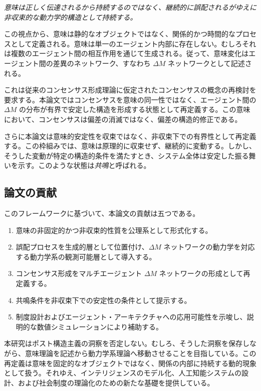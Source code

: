 \documentclass[11pt,a4paper]{article}
\theoremstyle{definition}
\begin{document}
\textit{意味は正しく伝達されるから持続するのではなく、継続的に誤配されるがゆえに非収束的な動力学的構造として持続する。}

この視点から、意味は静的なオブジェクトではなく、関係的かつ時間的なプロセスとして定義される。意味は単一のエージェント内部に存在しない。むしろそれは複数のエージェント間の相互作用を通じて生成される。従って、意味変化はエージェント間の差異のネットワーク、すなわち $\Delta M$ ネットワークとして記述される。

これは従来のコンセンサス形成理論に仮定されたコンセンサスの概念の再検討を要求する。本論文ではコンセンサスを意味の同一性ではなく、エージェント間の $\Delta M$ の分布が有界で安定した構造を形成する状態として再定義する。この意味において、コンセンサスは偏差の消滅ではなく、偏差の構造的修正である。

さらに本論文は意味的安定性を収束ではなく、非収束下での有界性として再定義する。この枠組みでは、意味は原理的に収束せず、継続的に変動する。しかし、そうした変動が特定の構造的条件を満たすとき、システム全体は安定した振る舞いを示す。このような状態は\textit{共鳴}と呼ばれる。

\subsection{論文の貢献}

このフレームワークに基づいて、本論文の貢献は五つである。

\begin{enumerate}
\item 意味の非固定的かつ非収束的性質を公理系として形式化する。
\item 誤配プロセスを生成的層として位置付け、$\Delta M$ ネットワークの動力学を対応する動力学系の観測可能層として導入する。
\item コンセンサス形成をマルチエージェント $\Delta M$ ネットワークの形成として再定義する。
\item 共鳴条件を非収束下での安定性の条件として提示する。
\item 制度設計およびエージェント・アーキテクチャへの応用可能性を示唆し、説明的な数値シミュレーションにより補助する。
\end{enumerate}

本研究はポスト構造主義の洞察を否定しない。むしろ、そうした洞察を保存しながら、意味理論を記述から動力学系理論へ移動させることを目指している。この再定義は意味を固定的なオブジェクトではなく、関係の内部に持続する動的現象として扱う。それゆえ、インテリジェンスのモデル化、人工知能システムの設計、および社会制度の理論化のための新たな基礎を提供している。
\end{document}
